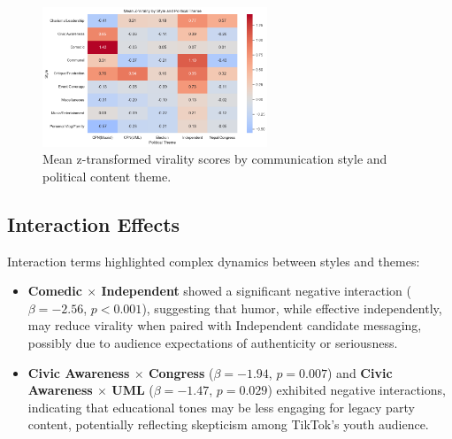 \documentclass[12pt,a4paper]{report}
\begin{document}
\begin{figure}[ht]
\centering
\includegraphics[width=0.6\textwidth]{figures/RQ2/Mean_Z_Virality.png}
\caption{Mean z-transformed virality scores by communication style and political content theme.}
\label{fig:Mean_Z_Virality}
\end{figure}

\subsection{Interaction Effects}
Interaction terms highlighted complex dynamics between styles and themes:
\begin{itemize}[noitemsep]
    \item \textbf{Comedic \(\times\) Independent} showed a significant negative interaction (\( \beta = -2.56 \), \( p < 0.001 \)), suggesting that humor, while effective independently, may reduce virality when paired with Independent candidate messaging, possibly due to audience expectations of authenticity or seriousness.
    \item \textbf{Civic Awareness \(\times\) Congress} (\( \beta = -1.94 \), \( p = 0.007 \)) and \textbf{Civic Awareness \(\times\) UML} (\( \beta = -1.47 \), \( p = 0.029 \)) exhibited negative interactions, indicating that educational tones may be less engaging for legacy party content, potentially reflecting skepticism among TikTok’s youth audience.
\end{itemize}
\end{document}
